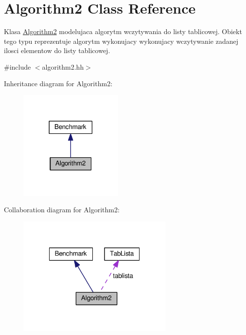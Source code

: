 \hypertarget{class_algorithm2}{\section{Algorithm2 Class Reference}
\label{class_algorithm2}
}


Klasa \hyperlink{class_algorithm2}{Algorithm2} modelujaca algorytm wczytywania do listy tablicowej. Obiekt tego typu reprezentuje algorytm wykonujacy wykonujacy wczytywanie zadanej ilosci elementow do listy tablicowej.  




{\ttfamily \#include $<$algorithm2.\-hh$>$}



Inheritance diagram for Algorithm2\-:\nopagebreak
\begin{figure}[H]
\begin{center}
\leavevmode
\includegraphics[width=146pt]{class_algorithm2__inherit__graph}
\end{center}
\end{figure}


Collaboration diagram for Algorithm2\-:\nopagebreak
\begin{figure}[H]
\begin{center}
\leavevmode
\includegraphics[width=219pt]{class_algorithm2__coll__graph}
\end{center}
\end{figure}
